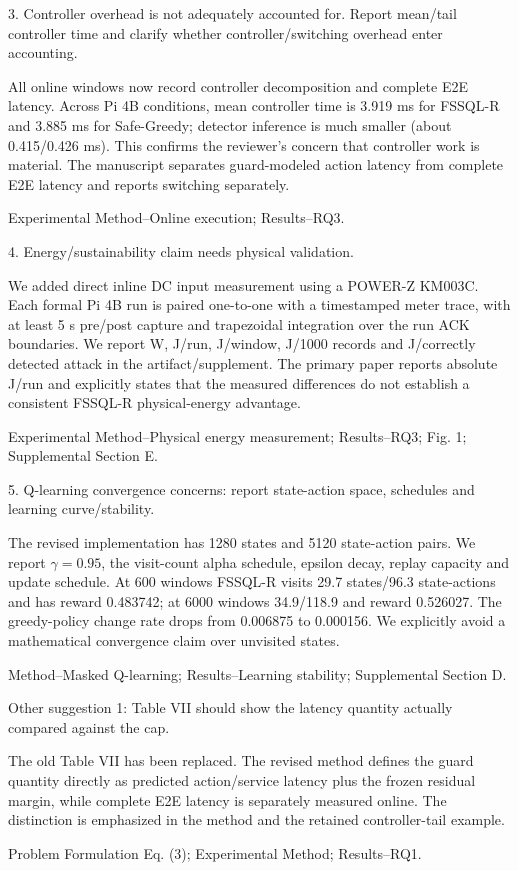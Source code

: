 \documentclass[11pt,a4paper]{article}
\newcommand{\commentbox}[1]{\begin{rcommentbox}#1\end{rcommentbox}}
\newcommand{\responsebox}[1]{\begin{authorresponsebox}#1\end{authorresponsebox}}
\newcommand{\changebox}[1]{\begin{wherebox}#1\end{wherebox}}
\begin{document}
\commentbox{3. Controller overhead is not adequately accounted for. Report mean/tail controller time and clarify whether controller/switching overhead enter accounting.}
\responsebox{All online windows now record controller decomposition and complete E2E latency. Across Pi 4B conditions, mean controller time is 3.919 ms for FSSQL-R and 3.885 ms for Safe-Greedy; detector inference is much smaller (about 0.415/0.426 ms). This confirms the reviewer's concern that controller work is material. The manuscript separates guard-modeled action latency from complete E2E latency and reports switching separately.}
\changebox{Experimental Method--Online execution; Results--RQ3.}

\commentbox{4. Energy/sustainability claim needs physical validation.}
\responsebox{We added direct inline DC input measurement using a POWER-Z KM003C. Each formal Pi 4B run is paired one-to-one with a timestamped meter trace, with at least 5 s pre/post capture and trapezoidal integration over the run ACK boundaries. We report W, J/run, J/window, J/1000 records and J/correctly detected attack in the artifact/supplement. The primary paper reports absolute J/run and explicitly states that the measured differences do not establish a consistent FSSQL-R physical-energy advantage.}
\changebox{Experimental Method--Physical energy measurement; Results--RQ3; Fig. 1; Supplemental Section E.}

\commentbox{5. Q-learning convergence concerns: report state-action space, schedules and learning curve/stability.}
\responsebox{The revised implementation has 1280 states and 5120 state-action pairs. We report $\gamma=0.95$, the visit-count alpha schedule, epsilon decay, replay capacity and update schedule. At 600 windows FSSQL-R visits 29.7 states/96.3 state-actions and has reward 0.483742; at 6000 windows 34.9/118.9 and reward 0.526027. The greedy-policy change rate drops from 0.006875 to 0.000156. We explicitly avoid a mathematical convergence claim over unvisited states.}
\changebox{Method--Masked Q-learning; Results--Learning stability; Supplemental Section D.}

\commentbox{Other suggestion 1: Table VII should show the latency quantity actually compared against the cap.}
\responsebox{The old Table VII has been replaced. The revised method defines the guard quantity directly as predicted action/service latency plus the frozen residual margin, while complete E2E latency is separately measured online. The distinction is emphasized in the method and the retained controller-tail example.}
\changebox{Problem Formulation Eq. (3); Experimental Method; Results--RQ1.}
\end{document}
